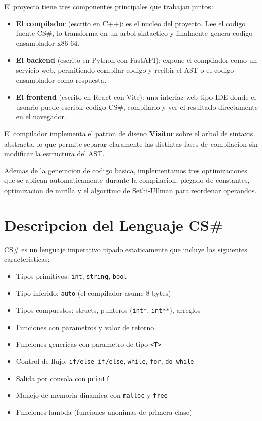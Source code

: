 \documentclass[12pt, a4paper]{article}
\begin{document}
El proyecto tiene tres componentes principales que trabajan juntos:

\begin{itemize}
    \item \textbf{El compilador} (escrito en C++): es el nucleo del proyecto. Lee el codigo fuente CS\#, lo transforma en un arbol sintactico y finalmente genera codigo ensamblador x86-64.
    \item \textbf{El backend} (escrito en Python con FastAPI): expone el compilador como un servicio web, permitiendo compilar codigo y recibir el AST o el codigo ensamblador como respuesta.
    \item \textbf{El frontend} (escrito en React con Vite): una interfaz web tipo IDE donde el usuario puede escribir codigo CS\#, compilarlo y ver el resultado directamente en el navegador.
\end{itemize}

El compilador implementa el patron de diseno \textbf{Visitor} sobre el arbol de sintaxis abstracta, lo que permite separar claramente las distintas fases de compilacion sin modificar la estructura del AST.

Ademas de la generacion de codigo basica, implementamos tres optimizaciones que se aplican automaticamente durante la compilacion: plegado de constantes, optimizacion de mirilla y el algoritmo de Sethi-Ullman para reordenar operandos.

\newpage

\section{Descripcion del Lenguaje CS\#}

CS\# es un lenguaje imperativo tipado estaticamente que incluye las siguientes caracteristicas:

\begin{itemize}
    \item Tipos primitivos: \texttt{int}, \texttt{string}, \texttt{bool}
    \item Tipo inferido: \texttt{auto} (el compilador asume 8 bytes)
    \item Tipos compuestos: structs, punteros (\texttt{int*}, \texttt{int**}), arreglos
    \item Funciones con parametros y valor de retorno
    \item Funciones genericas con parametro de tipo \texttt{<T>}
    \item Control de flujo: \texttt{if/else if/else}, \texttt{while}, \texttt{for}, \texttt{do-while}
    \item Salida por consola con \texttt{printf}
    \item Manejo de memoria dinamica con \texttt{malloc} y \texttt{free}
    \item Funciones lambda (funciones anonimas de primera clase)
\end{itemize}
\end{document}
